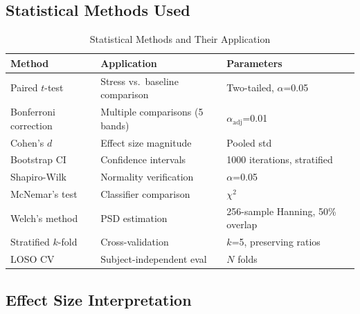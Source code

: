 \documentclass[11pt,a4paper]{article}
\begin{document}
\subsection{Statistical Methods Used}

\begin{table}[H]
\centering
\caption{Statistical Methods and Their Application}
\small
\begin{tabular}{lll}
\toprule
\textbf{Method} & \textbf{Application} & \textbf{Parameters} \\
\midrule
Paired $t$-test & Stress vs.\ baseline comparison & Two-tailed, $\alpha$=0.05 \\
Bonferroni correction & Multiple comparisons (5 bands) & $\alpha_{\text{adj}}$=0.01 \\
Cohen's $d$ & Effect size magnitude & Pooled std \\
Bootstrap CI & Confidence intervals & 1000 iterations, stratified \\
Shapiro-Wilk & Normality verification & $\alpha$=0.05 \\
McNemar's test & Classifier comparison & $\chi^2$ \\
Welch's method & PSD estimation & 256-sample Hanning, 50\% overlap \\
Stratified $k$-fold & Cross-validation & $k$=5, preserving ratios \\
LOSO CV & Subject-independent eval & $N$ folds \\
\bottomrule
\end{tabular}
\end{table}

\subsection{Effect Size Interpretation}
\end{document}
